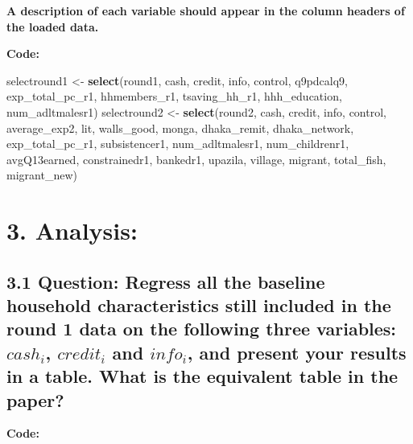 \documentclass[
]{article}
\newenvironment{Shaded}{\begin{snugshade}}{\end{snugshade}}
\newcommand{\FunctionTok}[1]{\textcolor[rgb]{0.13,0.29,0.53}{\textbf{#1}}}
\newcommand{\NormalTok}[1]{#1}
\newcommand{\OtherTok}[1]{\textcolor[rgb]{0.56,0.35,0.01}{#1}}
\begin{document}
\textbf{A description of each variable should appear in the column
headers of the loaded data. }

\textbf{Code:}

\begin{Shaded}
\begin{Highlighting}[]
\NormalTok{selectround1 }\OtherTok{\textless{}{-}} \FunctionTok{select}\NormalTok{(round1, cash, credit, info, control, q9pdcalq9, exp\_total\_pc\_r1, hhmembers\_r1, tsaving\_hh\_r1, hhh\_education, num\_adltmalesr1)}
\NormalTok{selectround2 }\OtherTok{\textless{}{-}} \FunctionTok{select}\NormalTok{(round2, cash, credit, info, control, average\_exp2, lit, walls\_good, monga, dhaka\_remit, dhaka\_network, exp\_total\_pc\_r1, subsistencer1, num\_adltmalesr1, num\_childrenr1, avgQ13earned, constrainedr1, bankedr1, upazila, village, migrant, total\_fish, migrant\_new)}
\end{Highlighting}
\end{Shaded}

\clearpage

\hypertarget{analysis}{%
\section{3. Analysis:}\label{analysis}}

\hypertarget{question-regress-all-the-baseline-household-characteristics-still-included-in-the-round-1-data-on-the-following-three-variables-cash_i-credit_i-and-info_i-and-present-your-results-in-a-table.-what-is-the-equivalent-table-in-the-paper}{%
\subsection{\texorpdfstring{3.1 \textbf{Question: Regress all the
baseline household characteristics still included in the round 1 data on
the following three variables: \(cash_i\), \(credit_i\) and \(info_i\),
and present your results in a table. What is the equivalent table in the
paper?}}{3.1 Question: Regress all the baseline household characteristics still included in the round 1 data on the following three variables: cash\_i, credit\_i and info\_i, and present your results in a table. What is the equivalent table in the paper?}}\label{question-regress-all-the-baseline-household-characteristics-still-included-in-the-round-1-data-on-the-following-three-variables-cash_i-credit_i-and-info_i-and-present-your-results-in-a-table.-what-is-the-equivalent-table-in-the-paper}}

\textbf{Code:}
\end{document}
